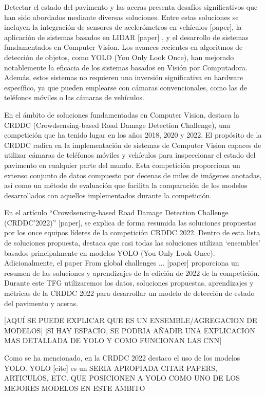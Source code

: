 Detectar el estado del pavimento y las aceras presenta desafíos significativos que han sido
abordados mediante diversas soluciones. Entre estas soluciones se incluyen la integración de
sensores de acelerómetros en vehículos [paper], la aplicación de sistemas basados en LIDAR
[paper] , y el desarrollo de sistemas fundamentados en Computer Vision. Los avances
recientes en algoritmos de detección de objetos, como YOLO (You Only Look Once), han
mejorado notablemente la eficacia de los sistemas basados en Visión por Computadora.
Además, estos sistemas no requieren una inversión significativa en hardware específico, ya
que pueden emplearse con cámaras convencionales, como las de teléfonos móviles o las
cámaras de vehículos.

En el ámbito de soluciones fundamentadas en Computer Vision, destaca la CRDDC
(Crowdsensing-based Road Damage Detection Challenge), una competición que ha tenido
lugar en los años 2018, 2020 y 2022. El propósito de la CRDDC radica en la implementación
de sistemas de Computer Vision capaces de utilizar cámaras de teléfonos móviles y vehículos
para inspeccionar el estado del pavimento en cualquier parte del mundo. Esta competición
proporciona un extenso conjunto de datos compuesto por decenas de miles de imágenes
anotadas, así como un método de evaluación que facilita la comparación de los modelos
desarrollados con aquellos implementados durante la competición.

En el artículo “Crowdsensing-based Road Damage Detection Challenge (CRDDC’2022)”
[paper], se explica de forma resumida las soluciones propuestas por los once equipos líderes
de la competición CRDDC 2022. Dentro de esta lista de soluciones propuesta, destaca que
casi todas las soluciones utilizan ‘ensembles’ basados principalmente en modelos YOLO (You
Only Look Once). Adicionalmente, el paper From global challenges ... [paper] proporciona un resumen de las soluciones y aprendizajes de la edición de 2022 de la competición. Durante este TFG utilizaremos los datos, soluciones propuestas, aprendizajes y métricas de la CRDDC 2022 para desarrollar un modelo de detección de estado del pavimento y aceras.

[AQUÍ SE PUEDE EXPLICAR QUE ES UN ENSEMBLE/AGREGACION DE MODELOS]
[SI HAY ESPACIO, SE PODRIA AÑADIR UNA EXPLICACION MAS DETALLADA DE YOLO Y COMO
FUNCIONAN LAS CNN]

Como se ha mencionado, en la CRDDC 2022 destaco el uso de los modelos YOLO. YOLO [cite] es un 
SERIA APROPIADA CITAR PAPERS, ARTICULOS, ETC. QUE POSICIONEN A YOLO COMO UNO DE LOS MEJORES MODELOS EN ESTE AMBITO

